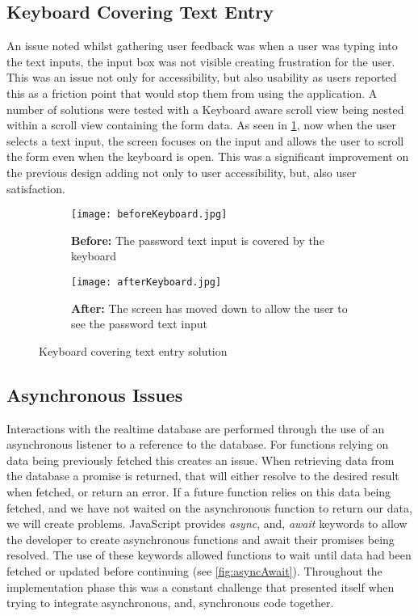 \subsection*{Keyboard Covering Text Entry}
An issue noted whilst gathering user feedback was when a user was typing into the text inputs, the input box was not visible creating frustration for the user. This was an issue not only for accessibility, but also usability as users reported this as a friction point that would stop them from using the application. A number of solutions were tested with a Keyboard aware scroll view being nested within a scroll view containing the form data. As seen in \ref{fig:keyboard}, now when the user selects a text input, the screen focuses on the input and allows the user to scroll the form even when the keyboard is open. This was a significant improvement on the previous design adding not only to user accessibility, but, also user satisfaction.
\begin{figure}[!htbp]
    \centering
    \begin{subfigure}[b]{0.25\textwidth}
        \texttt{[image: beforeKeyboard.jpg]}
        \caption{\textbf{Before:} The password text input is covered by the keyboard}
    \end{subfigure}
    \hspace{1.5em}
    \begin{subfigure}[b]{0.25\textwidth}
        \texttt{[image: afterKeyboard.jpg]}
        \caption{\textbf{After:} The screen has moved down to  allow  the user to see the password text input}
    \end{subfigure}
    \caption{Keyboard covering text entry solution }
    \label{fig:keyboard}
\end{figure}
\FloatBarrier

\subsection*{Asynchronous Issues}
Interactions with the realtime database are performed through the use of an asynchronous listener to a reference to the database. For functions relying on data being previously fetched this creates an issue. When retrieving data from the database a promise is returned, that will either resolve to the desired result when fetched, or return an error. If a future function relies on this data being fetched, and we have not waited on the asynchronous function to return our data, we will create problems. JavaScript provides \textit{async}, and, \textit{await} keywords to allow the developer to create asynchronous functions and await their promises being resolved. The use of these keywords allowed functions to wait until data had been fetched or updated before continuing (see \ref{fig:asyncAwait}). Throughout the implementation phase this was a constant challenge that presented itself when trying to integrate asynchronous, and, synchronous code together.

